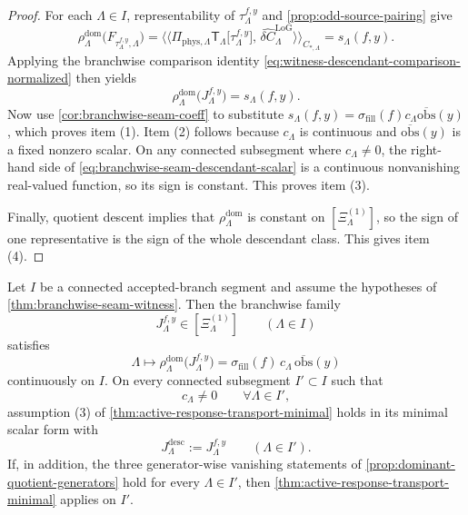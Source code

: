 \documentclass[11pt]{article}
\begin{document}
\begin{proof}
For each \(\Lambda\in I\), representability of \(\tau^{f,y}_{\Lambda}\) and
\cref{prop:odd-source-pairing} give
\[
\rho^{\mathrm{dom}}_{\Lambda}\!\big(F_{\tau^{f,y}_{\Lambda},\Lambda}\big)
=
\big\langle\!\big\langle
\Pi_{\mathrm{phys},\Lambda}\mathsf T_\Lambda\!\big[\tau^{f,y}_{\Lambda}\big],\,
\widehat{\delta C}^{\mathrm{LoG}}_{\Lambda}
\big\rangle\!\big\rangle_{C_{\ast,\Lambda}}
=
s_\Lambda(f,y).
\]
Applying the branchwise comparison identity
\eqref{eq:witness-descendant-comparison-normalized} then yields
\[
\rho^{\mathrm{dom}}_{\Lambda}\!\big(J^{f,y}_{\Lambda}\big)
=
s_\Lambda(f,y).
\]
Now use \cref{cor:branchwise-seam-coeff} to substitute
\(
s_\Lambda(f,y)
=
\sigma_{\mathrm{fill}}(f)c_\Lambda\overline{\mathrm{obs}}(y)
\),
which proves item (1).
Item (2) follows because \(c_\Lambda\) is continuous and
\(\overline{\mathrm{obs}}(y)\) is a fixed nonzero scalar.
On any connected subsegment where \(c_\Lambda\neq 0\), the right-hand side of
\eqref{eq:branchwise-seam-descendant-scalar} is a continuous nonvanishing real-valued function, so
its sign is constant.
This proves item (3).

Finally, quotient descent implies that \(\rho^{\mathrm{dom}}_{\Lambda}\) is constant on
\([\Xi^{(1)}_{\Lambda}]\), so the sign of one representative is the sign of the whole descendant
class.
This gives item (4).
\end{proof}

\begin{corollary}
\label{cor:branchwise-seam-minimal-input}
Let \(I\) be a connected accepted-branch segment and assume the hypotheses of
\cref{thm:branchwise-seam-witness}.
Then the branchwise family
\[
J^{f,y}_{\Lambda}\in[\Xi^{(1)}_{\Lambda}]
\qquad
(\Lambda\in I)
\]
satisfies
\[
\Lambda\longmapsto
\rho^{\mathrm{dom}}_{\Lambda}\!\big(J^{f,y}_{\Lambda}\big)
=
\sigma_{\mathrm{fill}}(f)\,
c_\Lambda\,
\overline{\mathrm{obs}}(y)
\]
continuously on \(I\).
On every connected subsegment \(I'\subset I\) such that
\[
c_\Lambda\neq 0
\qquad
\forall \Lambda\in I',
\]
assumption \textup{(3)} of \cref{thm:active-response-transport-minimal} holds in its minimal
scalar form with
\[
J^{\mathrm{desc}}_{\Lambda}:=J^{f,y}_{\Lambda}
\qquad
(\Lambda\in I').
\]
If, in addition, the three generator-wise vanishing statements of
\cref{prop:dominant-quotient-generators} hold for every \(\Lambda\in I'\), then
\cref{thm:active-response-transport-minimal} applies on \(I'\).
\end{corollary}
\end{document}
